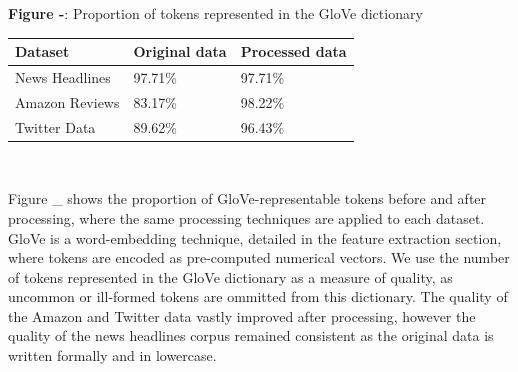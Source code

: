 \documentclass[12pt,a4paper]{article}
\begin{document}
\begin{center}
	\textbf{Figure -}:  Proportion of tokens represented in the GloVe dictionary\\
	\vspace{4pt}
	\begin{tabular}{p{3cm}||p{3cm}p{3cm}}
		\hline
		\textbf{Dataset} & \textbf{Original data} & \textbf{Processed data}\\
		\hline
		News Headlines & \hspace{20pt}97.71\% & \hspace{20pt}97.71\%\\
		\hline
		Amazon Reviews & \hspace{20pt}83.17\% & \hspace{20pt}98.22\%\\
		\hline
		Twitter Data & \hspace{20pt}89.62\% & \hspace{20pt}96.43\%\\
		\hline
	\end{tabular}\\
\end{center}

\noindent Figure \_ shows the proportion of GloVe-representable tokens before and after processing, where the same processing techniques are applied to each dataset. GloVe is a word-embedding technique, detailed in the feature extraction section, where tokens are encoded as pre-computed numerical vectors. We use the number of tokens represented in the GloVe dictionary as a measure of quality, as uncommon or ill-formed tokens are ommitted from this dictionary. The quality of the Amazon and Twitter data vastly improved after processing, however the quality of the news headlines corpus remained consistent as the original data is written formally and in lowercase.


\end{document}
